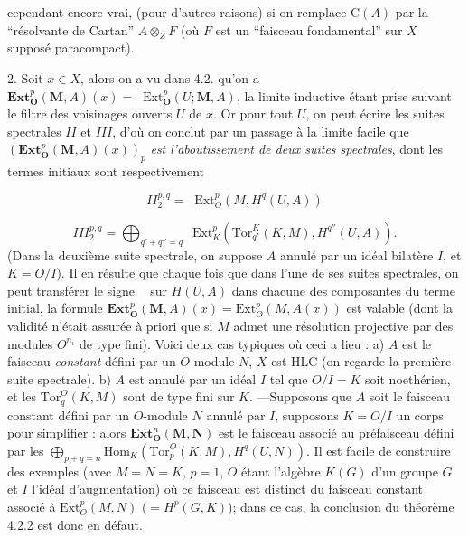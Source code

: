 \clearpage
{}

cependant encore vrai, (pour d'autres raisons) si on remplace $\mathrm C(A)$ par la
``résolvante de Cartan'' $A\otimes_ZF$ (où $F$ est un ``faisceau
fondamental'' sur $X$ supposé paracompact).

2. Soit $x\in X$, alors on a vu dans 4.2. qu'on a
$\mathbf{Ext}_{\mathbf O}^p(\mathbf M,A)(x)=
\mathop{\underset{\to}{\mathrm{lim.}}}\mathrm{Ext}_{\mathbf O}^p(U;\mathbf M,A)$, la limite inductive étant
prise suivant le filtre des voisinages ouverts $U$ de $x$.
Or pour tout $U$, on peut écrire les suites spectrales $II$ et $III$, d'où on
conclut par un passage à la limite facile que
$(\mathbf{Ext}_{\mathbf O}^p(\mathbf M,A)(x))_p$ \textit{est l'aboutissement de deux
suites spectrales}, dont les termes initiaux sont respectivement

\[
II_2^{p,q}=\mathop{\underset{\to}{\mathrm{lim.}}}
\mathrm{Ext}_O^p(M,H^q(U,A))
\]

\[
III_2^{p,q}=
\bigoplus_{q'+q''=q}\mathop{\underset{\to}{\mathrm{lim.}}}
\mathrm{Ext}_K^p(\mathrm{Tor}_{q'}^K(K,M),H^{q''}(U,A)).
\]
(Dans la deuxième suite spectrale, on suppose $A$ annulé par un idéal bilatère
$I$, et $K=O/I$).
Il en résulte que chaque fois que dans l'une de ses suites spectrales, on peut
transférer le signe $\mathop{\underset{\to}{\mathrm{lim.}}}$ sur $H(U,A)$ dans chacune des composantes du
terme initial, la formule
$\mathbf{Ext}_{\mathbf O}^p(\mathbf M,A)(x)=
\mathrm{Ext}_O^p(M,A(x))$ est valable (dont la validité n'était assurée à
priori que si $M$ admet une résolution projective par des modules $O^{n_i}$ de
type fini). Voici deux cas typiques où ceci a lieu :
a) $A$ est le faisceau \textit{constant} défini par un $O$-module $N$, $X$ est
HLC (on regarde la première suite spectrale).
b) $A$ est annulé par un idéal $I$ tel que $O/I=K$ soit noethérien, et les
$\mathrm{Tor}_q^O(K,M)$ sont de type fini sur $K$. ---Supposons que $A$ soit
le faisceau constant défini par un $O$-module $N$ annulé par $I$, supposons
$K=O/I$ un corps pour simplifier : alors
$\mathbf{Ext}_{\mathbf O}^n(\mathbf M,\mathbf N)$ est le faisceau associé au
préfaisceau défini par les
$\displaystyle \bigoplus_{p+q=n}
\mathrm{Hom}_K(\mathrm{Tor}_p^O(K,M),H^q(U,N)).$
Il est facile de construire des exemples (avec $M=N=K$, $p=1$, $O$ étant
l'algèbre $K(G)$ d'un groupe $G$ et $I$ l'idéal d'augmentation) où ce faisceau
est distinct du faisceau constant associé à
$\mathrm{Ext}_O^p(M,N)$ ($=H^p(G,K)$); dans ce cas, la conclusion du théorème
4.2.2 est donc en défaut.

